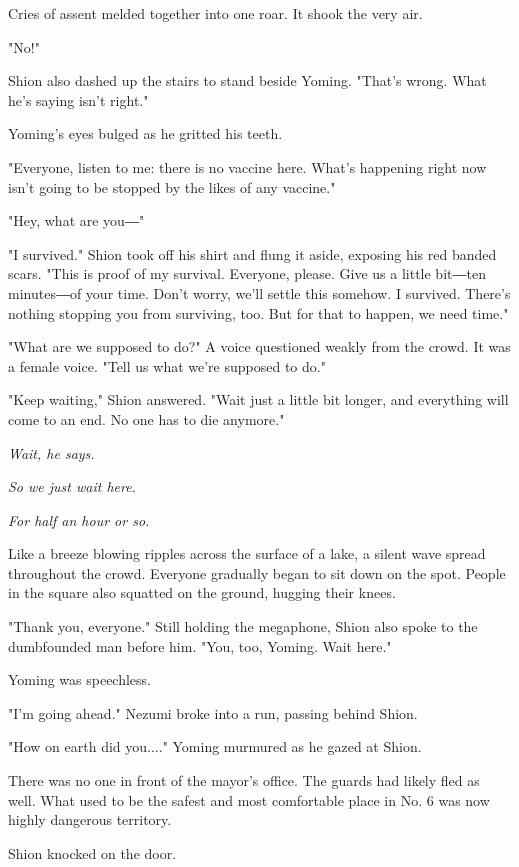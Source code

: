 Cries of assent melded together into one roar. It shook the very air.

"No!"

Shion also dashed up the stairs to stand beside Yoming. "That's wrong.
What he's saying isn't right."

Yoming's eyes bulged as he gritted his teeth.

"Everyone, listen to me: there is no vaccine here. What's happening
right now isn't going to be stopped by the likes of any vaccine."

"Hey, what are you―"

"I survived." Shion took off his shirt and flung it aside, exposing his
red banded scars. "This is proof of my survival. Everyone, please. Give
us a little bit―ten minutes―of your time. Don't worry, we'll settle this
somehow. I survived. There's nothing stopping you from surviving, too.
But for that to happen, we need time."

\mybreak

"What are we supposed to do?" A voice questioned weakly from the crowd.
It was a female voice. "Tell us what we're supposed to do."

"Keep waiting," Shion answered. "Wait just a little bit longer, and
everything will come to an end. No one has to die anymore."

\emph{Wait, he says.}

\emph{So we just wait here.}

\emph{For half an hour or so.}

Like a breeze blowing ripples across the surface of a lake, a silent
wave spread throughout the crowd. Everyone gradually began to sit down
on the spot. People in the square also squatted on the ground, hugging
their knees.

"Thank you, everyone." Still holding the megaphone, Shion also spoke to
the dumbfounded man before him. "You, too, Yoming. Wait here."

Yoming was speechless.

"I'm going ahead." Nezumi broke into a run, passing behind Shion.

"How on earth did you...." Yoming murmured as he gazed at Shion.

\myspace

There was no one in front of the mayor's office. The guards had likely
fled as well. What used to be the safest and most comfortable place in
No. 6 was now highly dangerous territory.

Shion knocked on the door.

